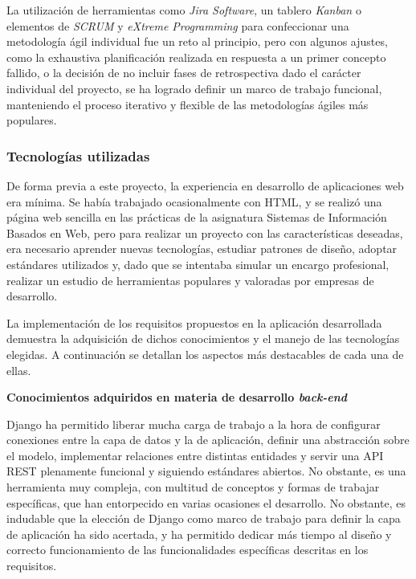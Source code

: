 \documentclass[10pt, a4paper]{aqademic}
\begin{document}
La utilización de herramientas como \textit{Jira Software}, un tablero \textit{Kanban} o elementos de \textit{SCRUM} y \textit{eXtreme Programming} para confeccionar una metodología ágil individual fue un reto al principio, pero con algunos ajustes, como la exhaustiva planificación realizada en respuesta a un primer concepto fallido, o la decisión de no incluir fases de retrospectiva dado el carácter individual del proyecto, se ha logrado definir un marco de trabajo funcional, manteniendo el proceso iterativo y flexible de las metodologías ágiles más populares.


\subsubsection{Tecnologías utilizadas}

De forma previa a este proyecto, la experiencia en desarrollo de aplicaciones web era mínima. Se había trabajado ocasionalmente con HTML, y se realizó una página web sencilla en las prácticas de la asignatura Sistemas de Información Basados en Web, pero para realizar un proyecto con las características deseadas, era necesario aprender nuevas tecnologías, estudiar patrones de diseño, adoptar estándares utilizados y, dado que se intentaba simular un encargo profesional, realizar un estudio de herramientas populares y valoradas por empresas de desarrollo. 

La implementación de los requisitos propuestos en la aplicación desarrollada demuestra la adquisición de dichos conocimientos y el manejo de las tecnologías elegidas. A continuación se detallan los aspectos más destacables de cada una de ellas.

\textbf{Conocimientos adquiridos en materia de desarrollo \textit{back-end}}

Django ha permitido liberar mucha carga de trabajo a la hora de configurar conexiones entre la capa de datos y la de aplicación, definir una abstracción sobre el modelo, implementar relaciones entre distintas entidades y servir una API REST plenamente funcional y siguiendo estándares abiertos. No obstante, es una herramienta muy compleja, con multitud de conceptos y formas de trabajar específicas, que han entorpecido en varias ocasiones el desarrollo. No obstante, es indudable que la elección de Django como marco de trabajo para definir la capa de aplicación ha sido acertada, y ha permitido dedicar más tiempo al diseño y correcto funcionamiento de las funcionalidades específicas descritas en los requisitos.
\end{document}

